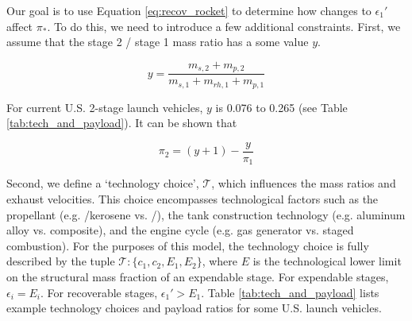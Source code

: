 \documentclass[conf]{new-aiaa}
\begin{document}
Our goal is to use Equation \ref{eq:recov_rocket} to determine how changes to $\epsilon_1'$ affect $\pi_*$. To do this, we need to introduce a few additional constraints. First, we assume that the stage 2 / stage 1 mass ratio has a some value $y$.

\begin{equation}
y = \frac{m_{s,2} + m_{p,2}}{m_{s,1} + m_{rh,1} + m_{p,1}}
\end{equation}

For current U.S. 2-stage launch vehicles, $y$ is 0.076 to 0.265 (see Table \ref{tab:tech_and_payload}). It can be shown that

\begin{equation}
\label{eq:ypi}
\pi_2 = (y + 1) - \frac{y}{\pi_1}
\end{equation}

Second, we define a `technology choice', $\mathcal{T}$, which influences the mass ratios and exhaust velocities. This choice encompasses technological factors such as the propellant (e.g. /kerosene vs. /), the tank construction technology (e.g. aluminum alloy vs. composite), and the engine cycle (e.g. gas generator vs. staged combustion). For the purposes of this model, the technology choice is fully described by the tuple $\mathcal{T} : \{ c_1, c_2, E_1, E_2 \}$, where $E$ is the technological lower limit on the structural mass fraction of an expendable stage. For expendable stages, $\epsilon_i = E_i$. For recoverable stages, $\epsilon_1' > E_1$. Table \ref{tab:tech_and_payload} lists example technology choices and payload ratios for some U.S. launch vehicles.
\end{document}

